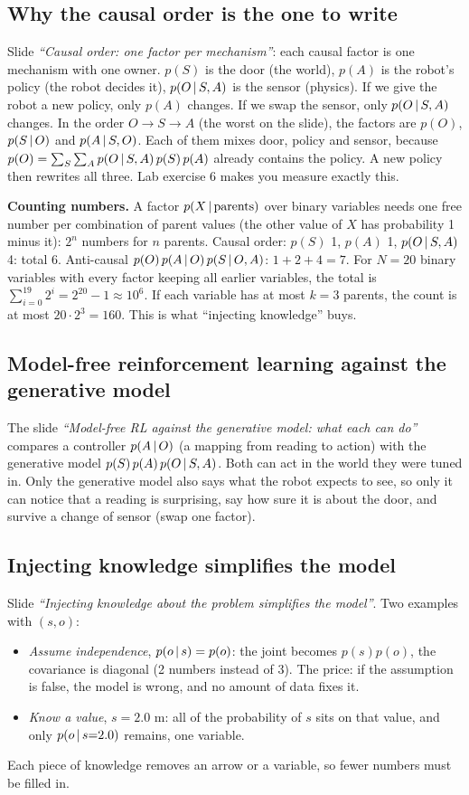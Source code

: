 \documentclass[11pt]{article}
\newcommand{\slide}[1]{\textit{``#1''}}
\begin{document}
\subsection*{Why the causal order is the one to write}
Slide \slide{Causal order: one factor per mechanism}: each causal factor is one mechanism with one owner. $p(S)$ is the door (the world), $p(A)$ is the robot's policy (the robot decides it), $p(O\,|\, S,A)$ is the sensor (physics).
If we give the robot a new policy, only $p(A)$ changes. If we swap the sensor, only $p(O\,|\, S,A)$ changes.
In the order $O\to S\to A$ (the worst on the slide), the factors are $p(O)$, $p(S\,|\, O)$ and $p(A\,|\, S,O)$. Each of them mixes door, policy and sensor, because $p(O)=\sum_S\sum_A p(O\,|\, S,A)\,p(S)\,p(A)$ already contains the policy. A new policy then rewrites all three.
Lab exercise 6 makes you measure exactly this.

\textbf{Counting numbers.} A factor $p(X\,|\,\text{parents})$ over binary variables needs one free number per combination of parent values (the other value of $X$ has probability 1 minus it): $2^{n}$ numbers for $n$ parents.
Causal order: $p(S)$ 1, $p(A)$ 1, $p(O\,|\, S,A)$ 4: total 6. Anti-causal $p(O)\,p(A\,|\, O)\,p(S\,|\, O,A)$: $1+2+4=7$. For $N=20$ binary variables with every factor keeping all earlier variables, the total is $\sum_{i=0}^{19}2^i=2^{20}-1\approx10^6$. If each variable has at most $k=3$ parents, the count is at most $20\cdot2^3=160$. This is what ``injecting knowledge'' buys.

\subsection*{Model-free reinforcement learning against the generative model}
The slide \slide{Model-free RL against the generative model: what each can do} compares a controller $p(A\,|\, O)$ (a mapping from reading to action) with the generative model $p(S)\,p(A)\,p(O\,|\, S,A)$.
Both can act in the world they were tuned in. Only the generative model also says what the robot expects to see, so only it can notice that a reading is surprising, say how sure it is about the door, and survive a change of sensor (swap one factor).

\subsection*{Injecting knowledge simplifies the model}
Slide \slide{Injecting knowledge about the problem simplifies the model}. Two examples with $(s,o)$:
\begin{itemize}[nosep]
\item \emph{Assume independence}, $p(o\,|\, s)=p(o)$: the joint becomes $p(s)p(o)$, the covariance is diagonal (2 numbers instead of 3). The price: if the assumption is false, the model is wrong, and no amount of data fixes it.
\item \emph{Know a value}, $s=2.0$ m: all of the probability of $s$ sits on that value, and only $p(o\,|\, s{=}2.0)$ remains, one variable.
\end{itemize}
Each piece of knowledge removes an arrow or a variable, so fewer numbers must be filled in.
\end{document}
